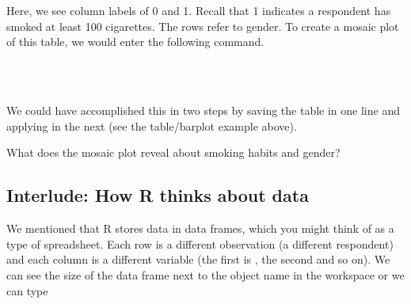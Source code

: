 \documentclass[11pt]{article}
\begin{document}
\ttfamily\noindent
\hlstd{}\hspace*{\fill}\\
\hlstd{}\hlkeyword{(}\hlkeyword{\usebox{\hlnormalsizeboxdollar}}\hlkeyword{,}\hlkeyword{\usebox{\hlnormalsizeboxdollar}}\hlkeyword{)}\hspace*{\fill}\\
\normalfont

Here, we see column labels of 0 and 1. Recall that 1 indicates a respondent has smoked at least 100 cigarettes. The rows refer to gender. To create a mosaic plot of this table, we would enter the following command.

\ttfamily\noindent
\hlstd{}\hspace*{\fill}\\
\hlstd{}\hlkeyword{(}\hlkeyword{(}\hlkeyword{\usebox{\hlnormalsizeboxdollar}}\hlkeyword{,}\hlkeyword{\usebox{\hlnormalsizeboxdollar}}\hlkeyword{)}\hlkeyword{)}\hspace*{\fill}\\
\normalfont

We could have accomplished this in two steps by saving the table in one line and applying \texttt{} in the next (see the table/barplot example above).

\begin{exercise}
What does the mosaic plot reveal about smoking habits and gender?
\end{exercise}


\subsection*{Interlude: How R thinks about data}
We mentioned that R stores data in data frames, which you might think of as a type of spreadsheet. Each row is a different observation (a different respondent) and each column is a different variable (the first is \texttt{}, the second \texttt{} and so on). We can see the size of the data frame next to the object name in the workspace or we can type

\ttfamily\noindent
\hlstd{}\hspace*{\fill}\\
\hlstd{}\hlkeyword{(}\hlkeyword{)}\hspace*{\fill}\\
\normalfont
\end{document}

